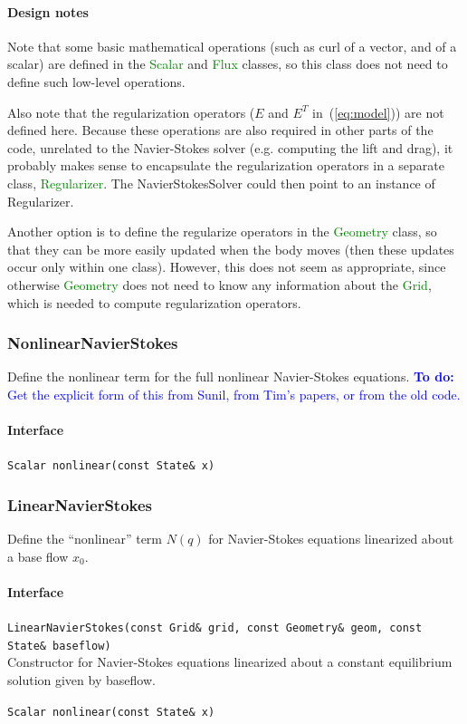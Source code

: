\documentclass[11pt]{article}
\def\todo#1{\textcolor{blue}{{\bf To do:} #1}}
\def\class#1{\textcolor{green}{\ttfamily\small #1}} %
\def\fn#1{{\ttfamily\small #1}} %
\let\code\lstinline
\begin{document}
\paragraph{Design notes}
Note that some basic mathematical operations (such as curl of a vector, and of a scalar) are defined in the \class{Scalar} and \class{Flux} classes, so this class does not need to define such low-level operations.

Also note that the regularization operators ($E$ and $E^T$ in~(\ref{eq:model})) are not defined here.  Because these operations are also required in other parts of the code, unrelated to the Navier-Stokes solver (e.g. computing the lift and drag), it probably makes sense to encapsulate the regularization operators in a separate class, \class{Regularizer}.  The NavierStokesSolver could then point to an instance of Regularizer.

Another option is to define the \fn{regularize} operators in the \class{Geometry} class, so that they can be more easily updated when the body moves (then these updates occur only within one class).  However, this does not seem as appropriate, since otherwise \class{Geometry} does not need to know any information about the \class{Grid}, which is needed to compute regularization operators.


\subsubsection{NonlinearNavierStokes}
Define the nonlinear term for the full nonlinear Navier-Stokes equations.
\todo{Get the explicit form of this from Sunil, from Tim's papers, or from the old code.}
\paragraph{Interface}
\begin{description}
	\item \code|Scalar nonlinear(const State& x)|
\end{description}

\subsubsection{LinearNavierStokes}
Define the ``nonlinear'' term $N(q)$ for Navier-Stokes equations linearized about a base flow $x_0$.

\paragraph{Interface}
\begin{description}
	\item \code|LinearNavierStokes(const Grid& grid, const Geometry& geom, const State& baseflow)|\\
		Constructor for Navier-Stokes equations linearized about a constant equilibrium solution given by baseflow.
	\item \code|Scalar nonlinear(const State& x)|
\end{description}
\end{document}
